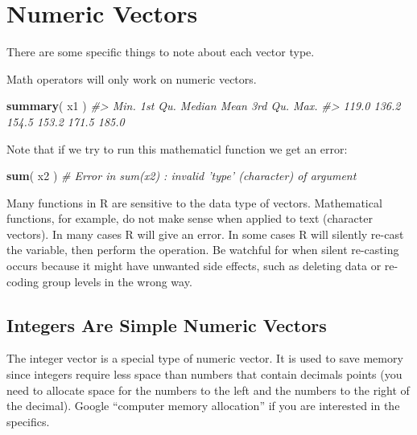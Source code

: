 \documentclass[]{book}
\newenvironment{Shaded}{\begin{snugshade}}{\end{snugshade}}
\newcommand{\CommentTok}[1]{\textcolor[rgb]{0.56,0.35,0.01}{\textit{#1}}}
\newcommand{\KeywordTok}[1]{\textcolor[rgb]{0.13,0.29,0.53}{\textbf{#1}}}
\newcommand{\NormalTok}[1]{#1}
\theoremstyle{definition}
\theoremstyle{definition}
\theoremstyle{definition}
\theoremstyle{remark}
\begin{document}
\hypertarget{numeric-vectors}{%
\section{Numeric Vectors}\label{numeric-vectors}}

There are some specific things to note about each vector type.

Math operators will only work on numeric vectors.

\begin{Shaded}
\begin{Highlighting}[]

\KeywordTok{summary}\NormalTok{( x1 )}
\CommentTok{#>    Min. 1st Qu.  Median    Mean 3rd Qu.    Max. }
\CommentTok{#>   119.0   136.2   154.5   153.2   171.5   185.0}
\end{Highlighting}
\end{Shaded}

Note that if we try to run this mathematicl function we get an error:

\begin{Shaded}
\begin{Highlighting}[]

\KeywordTok{sum}\NormalTok{( x2 ) }\CommentTok{# Error in sum(x2) : invalid 'type' (character) of argument}
\end{Highlighting}
\end{Shaded}

Many functions in R are sensitive to the data type of vectors.
Mathematical functions, for example, do not make sense when applied to
text (character vectors). In many cases R will give an error. In some
cases R will silently re-cast the variable, then perform the operation.
Be watchful for when silent re-casting occurs because it might have
unwanted side effects, such as deleting data or re-coding group levels
in the wrong way.

\hypertarget{integers-are-simple-numeric-vectors}{%
\subsection{Integers Are Simple Numeric
Vectors}\label{integers-are-simple-numeric-vectors}}

The integer vector is a special type of numeric vector. It is used to
save memory since integers require less space than numbers that contain
decimals points (you need to allocate space for the numbers to the left
and the numbers to the right of the decimal). Google ``computer memory
allocation'' if you are interested in the specifics.
\end{document}
